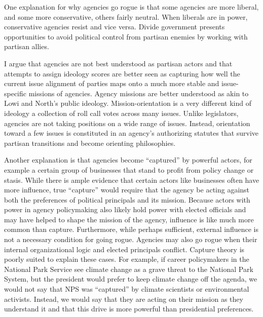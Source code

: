 One explanation for why agencies go rogue is that some agencies are more liberal, and some more conservative, others fairly neutral. When liberals are in power, conservative agencies resist and vice versa. Divide government presents opportunities to avoid political control from partisan enemies by working with partisan allies.
 
I argue that agencies are not best understood as partisan actors and that attempts to assign ideology scores are better seen as capturing how well the current issue alignment of parties maps onto a much more stable and issue-specific missions of agencies. Agency missions are better understood as akin to Lowi and North’s public ideology. Mission-orientation is a very different kind of ideology a collection of roll call votes across many issues. Unlike legislators, agencies are not taking positions on a wide range of issues. Instead, orientation toward a few issues is constituted in an agency’s authorizing statutes that survive partisan transitions and become orienting philosophies.  
 
 
Another explanation is that agencies become “captured” by powerful actors, for example a certain group of businesses that stand to profit from policy change or stasis. While there is ample evidence that certain actors like businesses often have more influence, true “capture” would require that the agency be acting against both the preferences of political principals and its mission. Because actors with power in agency policymaking also likely hold power with elected officials and may have helped to shape the mission of the agency, influence is like much more common than capture. Furthermore, while perhaps sufficient,  external influence is not a necessary condition for going rogue. Agencies may also go rogue when their internal organizational logic and elected principals conflict. Capture theory is poorly suited to explain these cases. For example, if career policymakers in the National Park Service see climate change as a grave threat to the National Park System, but the president would prefer to keep climate change off the agenda, we would not say that NPS was “captured” by climate scientists or environmental activists. Instead, we would say that they are acting on their mission as they understand it and that this drive is more powerful than presidential preferences.
 
 
 
 
